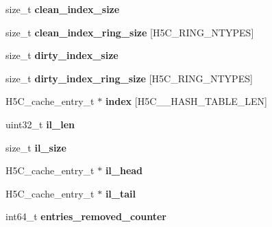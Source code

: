 \begin{DoxyCompactItemize}
\mbox{\label{struct_h5_c__t_a233aee6747b296176d63583130f020f4}} 
size\+\_\+t {\bfseries clean\+\_\+index\+\_\+size}
\item 
\mbox{\label{struct_h5_c__t_a7600242377e43a0fe7f09f5a37388ad9}} 
size\+\_\+t {\bfseries clean\+\_\+index\+\_\+ring\+\_\+size} \mbox{[}H5\+C\+\_\+\+R\+I\+N\+G\+\_\+\+N\+T\+Y\+P\+ES\mbox{]}
\item 
\mbox{\label{struct_h5_c__t_a1f6b1920e7e79779268c18a7bc32a486}} 
size\+\_\+t {\bfseries dirty\+\_\+index\+\_\+size}
\item 
\mbox{\label{struct_h5_c__t_a6a6d0d1f04a5fe50f0556ab68190e453}} 
size\+\_\+t {\bfseries dirty\+\_\+index\+\_\+ring\+\_\+size} \mbox{[}H5\+C\+\_\+\+R\+I\+N\+G\+\_\+\+N\+T\+Y\+P\+ES\mbox{]}
\item 
\mbox{\label{struct_h5_c__t_a58583387c9bca14b8471851c312ed751}} 
H5\+C\+\_\+cache\+\_\+entry\+\_\+t $\ast$ {\bfseries index} \mbox{[}H5\+C\+\_\+\+\_\+\+H\+A\+S\+H\+\_\+\+T\+A\+B\+L\+E\+\_\+\+L\+EN\mbox{]}
\item 
\mbox{\label{struct_h5_c__t_ae36ab30ea42141b6cd984e189d546800}} 
uint32\+\_\+t {\bfseries il\+\_\+len}
\item 
\mbox{\label{struct_h5_c__t_a7743a028cf2127361725ad908a2c9226}} 
size\+\_\+t {\bfseries il\+\_\+size}
\item 
\mbox{\label{struct_h5_c__t_a02032abe9b01bdc63348d358526587d6}} 
H5\+C\+\_\+cache\+\_\+entry\+\_\+t $\ast$ {\bfseries il\+\_\+head}
\item 
\mbox{\label{struct_h5_c__t_a026664150c543d9a183cf7f32ca2e53d}} 
H5\+C\+\_\+cache\+\_\+entry\+\_\+t $\ast$ {\bfseries il\+\_\+tail}
\item 
\mbox{\label{struct_h5_c__t_af8c9c4656d55864aaa31a94e179a0f16}} 
int64\+\_\+t {\bfseries entries\+\_\+removed\+\_\+counter}
\item 
\mbox{\label{struct_h5_c__t_a51b23ba181af40dadf53a9dfd84db07a}} 

\end{DoxyCompactItemize}
